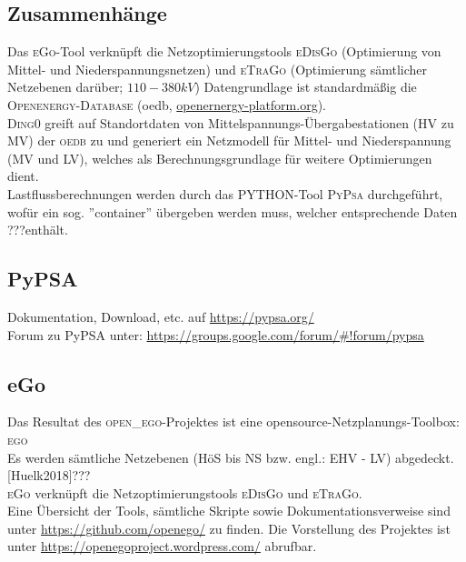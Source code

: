 \documentclass[
a4paper,     %
12pt         %
]{scrartcl}  %
\begin{document}
\subsection{Zusammenhänge}
Das \textsc{eGo}-Tool verknüpft die Netzoptimierungstools \textsc{eDisGo} (Optimierung von Mittel- und Niederspannungsnetzen) und \textsc{eTraGo} (Optimierung sämtlicher Netzebenen darüber; $110 - 380kV$)
Datengrundlage ist standardmäßig die \textsc{Openenergy-Database} (oedb, \url{openernergy-platform.org}).\\
\textsc{Ding0} greift auf Standortdaten von Mittelspannungs-Übergabestationen (HV zu MV) der \textsc{oedb} zu und generiert ein Netzmodell für Mittel- und Niederspannung (MV und LV), welches als Berechnungsgrundlage für weitere Optimierungen dient.\\
Lastflussberechnungen werden durch das \textsc{PYTHON}-Tool \textsc{PyPsa} durchgeführt, wofür ein sog. ''container'' übergeben werden muss, welcher entsprechende Daten ???enthält.\\


\subsection{PyPSA}
Dokumentation, Download, etc. auf
\url{https://pypsa.org/}\\

Forum zu PyPSA unter:
\url{https://groups.google.com/forum/#!forum/pypsa}



\subsection{eGo}
Das Resultat des \textsc{open\_ego}-Projektes ist eine opensource-Netzplanungs-Toolbox: \textsc{ego}\\
Es werden sämtliche Netzebenen (HöS bis NS bzw. engl.: EHV - LV) abgedeckt.
[Huelk2018]???\\
\textsc{eGo} verknüpft die Netzoptimierungstools \textsc{eDisGo} und \textsc{eTraGo}.\\
Eine Übersicht der Tools, sämtliche Skripte sowie Dokumentationsverweise sind unter \url{https://github.com/openego/} zu finden.
Die Vorstellung des Projektes ist unter  \url{https://openegoproject.wordpress.com/} abrufbar.
\end{document}
